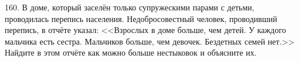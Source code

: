 160. В доме, который заселён только супружескими парами с детьми, проводилась перепись населения. Недобросовестный человек, проводивший перепись, в отчёте указал: <<Взрослых в доме больше, чем детей. У каждого мальчика есть сестра. Мальчиков больше, чем девочек. Бездетных семей нет.>> Найдите в этом отчёте
как можно больше нестыковок и объясните их.\\
